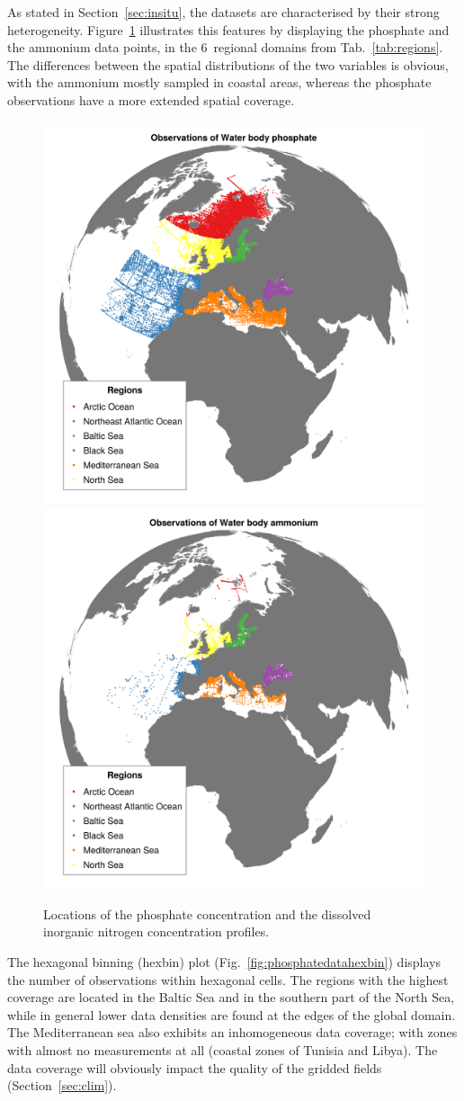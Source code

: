 \documentclass[essd,manuscript]{copernicus}
\begin{document}
As stated in Section~\ref{sec:insitu}, the datasets are characterised by their strong heterogeneity. Figure~\ref{fig:phosphatedata} illustrates this features by displaying the phosphate and the ammonium data points, in the 6~regional domains from Tab.~\ref{tab:regions}. The differences between the spatial distributions of the two variables is obvious, with the ammonium mostly sampled in coastal areas, whereas the phosphate observations have a more extended spatial coverage.

\begin{figure}[t]
\includegraphics[width=.49\textwidth]{observations_Water_body_phosphate.png}\includegraphics[width=.49\textwidth]{observations_Water_body_ammonium.png}
\caption{Locations of the phosphate concentration and the dissolved inorganic nitrogen concentration profiles.\label{fig:phosphatedata}}
\end{figure}

The hexagonal binning (hexbin) plot (Fig.~\ref{fig:phosphatedatahexbin}) displays the number of observations within hexagonal cells. The regions with the highest coverage are located in the Baltic Sea and in the southern part of the North Sea, while in general lower data densities are found at the edges of the global domain. The Mediterranean sea also exhibits an inhomogeneous data coverage; with zones with almost no measurements at all (coastal zones of Tunisia and Libya). The data coverage will obviously impact the quality of the gridded fields (Section~\ref{sec:clim}).
\end{document}
